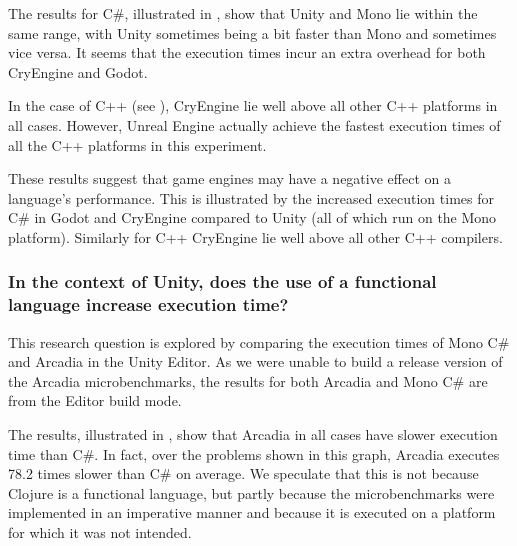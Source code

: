 
The results for C\#, illustrated in , show that Unity and Mono lie within the same range, with Unity sometimes being a bit faster than Mono and sometimes vice versa. It seems that the execution times incur an extra overhead for both CryEngine and Godot.

In the case of C++ (see ), CryEngine lie well above all other C++ platforms in all cases. However, Unreal Engine actually achieve the fastest execution times of all the C++ platforms in this experiment.

These results suggest that game engines may have a negative effect on a language's performance. This is illustrated by the increased execution times for C\# in Godot and CryEngine compared to Unity (all of which run on the Mono platform). Similarly for C++ CryEngine lie well above all other C++ compilers.

\subsubsection{In the context of Unity, does the use of a functional language increase execution time?} \label{sec:functional-overhead}
This research question is explored by comparing the execution times of Mono C\# and Arcadia in the Unity Editor. As we were unable to build a release version of the Arcadia microbenchmarks, the results for both Arcadia and Mono C\# are from the Editor build mode.


The results, illustrated in , show that Arcadia in all cases have slower execution time than C\#. In fact, over the problems shown in this graph, Arcadia executes 78.2 times slower than C\# on average. We speculate that this is not because Clojure is a functional language, but partly because the microbenchmarks were implemented in an imperative manner and because it is executed on a platform for which it was not intended. 

